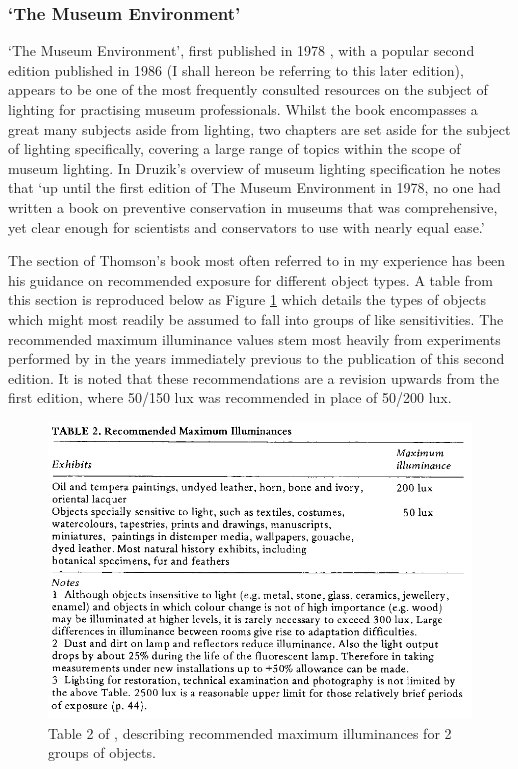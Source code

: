 \subsubsection{`The Museum Environment'}

`The Museum Environment', first published in 1978 \citep{thomson_museum_1978}, with a popular second edition published in 1986 \citep{thomson_museum_1986} (I shall hereon be referring to this later edition), appears to be one of the most frequently consulted resources on the subject of lighting for practising museum professionals. Whilst the book encompasses a great many subjects aside from lighting, two chapters are set aside for the subject of lighting specifically, covering a large range of topics within the scope of museum lighting. In Druzik's overview of museum lighting specification \citep{druzik_museum_2007} he notes that `up until the first edition of The Museum Environment in 1978, no one had written a book on preventive conservation in museums that was comprehensive, yet clear enough for scientists and conservators to use with nearly equal ease.'

The section of Thomson's book most often referred to in my experience has been his guidance on recommended exposure for different object types. A table from this section is reproduced below as Figure \ref{fig:Thomson} which details the types of objects which might most readily be assumed to fall into groups of like sensitivities. The recommended maximum illuminance values stem most heavily from experiments performed by \citet{loe_preferred_1982} in the years immediately previous to the publication of this second edition. It is noted that these recommendations are a revision upwards from the first edition, where 50/150 lux was recommended in place of 50/200 lux.

\begin{figure}[htbp]
\includegraphics[max width=\textwidth]{figs/LitRev/Thomson.png}
\caption{Table 2 of \citet[p. 23]{thomson_museum_1986}, describing recommended maximum illuminances for 2 groups of objects.}
\label{fig:Thomson}
\end{figure}

